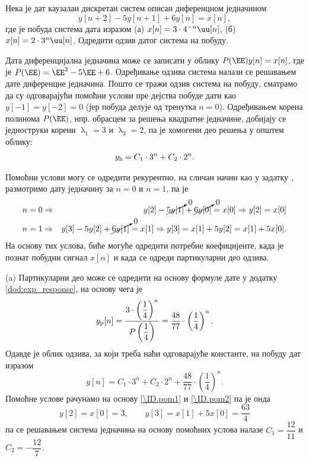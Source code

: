 \PID
Нека је дат каузалан дискретан систем описан диференцном једначином 
$$y[n+2] - 5 y[n+1] + 6 y[n] = x[n],$$ где је побуда система 
дата изразом (а) $x[n] = 3\cdot 4^{-n} \uu[n]$, (б) $x[n] = 2 \cdot 3^n \uu[n]$. Одредити одзив датог система на побуду.     

\RESENJE 
Дата диференцијална једначина може се записати у облику 
$P(\EE) y[n] = x[n]$, где је $P(\EE) = \EE^2 - 5\EE + 6$. 
Одређивање одзива система налази се решавањем дате диференцне једначина. Пошто се тражи одзив система на побуду, 
сматрамо да су одговарајући помоћни услови пре дејства побуде дати као $y[-1] = y[-2] = 0$ (јер побуда делује од 
тренутка $n=0$). Одређивањем корена полинома $P(\EE)$, нпр. обрасцем за решења квадратне једначине, добијају се 
једноструки корени $\uplambda_1 = 3$ и $\uplambda_2 = 2$, па је хомогени део решења у општем облику:
\begin{eqnarray}
    y_{\rm h} = C_1 \cdot 3^n + C_2 \cdot 2^n.
\end{eqnarray}

Помоћни услови могу се одредити рекурентно, на сличан начин као у задатку , размотримо дату једначину за $n = 0$ и $n = 1$, па је 
\begin{eqnarray}
    n=0 &\Rightarrow& y[2] - \cancelto{0}{5 y[1]} + \cancelto{0}{6 y[0]} = x[0] \Rightarrow y[2] = x[0] \label{\ID.pom1}
    \\ 
    n=1 &\Rightarrow& y[3] - 5y[2] + \cancelto{0}{6y[1]} = x[1] \Rightarrow y[3] = x[1] + 5 y[2] = x[1] + 5 x[0]. \label{\ID.pom2}
\end{eqnarray}
На основу тих услова, биће могуће одредити потребне коефицијенте, када је познат побудни сигнал $x[n]$ и када се одреди партикуларни део одзива.



(a) Партикуларни део може се одредити на основу формуле дате у додатку \ref{dod:exp_response}, на основу чега је 
\begin{eqnarray}
    y_{\rm p}[n] = \dfrac{3 \cdot \left( \dfrac14 \right)^n }{ P\left( \dfrac14 \right) } = \dfrac{48}{77} \cdot \left( \dfrac14 \right)^n.
\end{eqnarray}
Одавде је облик одзива, за који треба наћи одговарајуће константе, на побуду дат изразом 
\begin{equation}
    y[n] = C_1 \cdot 3^n + C_2 \cdot 2^n +  \dfrac{48}{77} \cdot \left( \dfrac14 \right)^n.
\end{equation}
Помоћне услове рачунамо на основу \eqref{\ID.pom1} и \eqref{\ID.pom2} па је онда 
\begin{equation}
    y[2] = x[0] = 3, \qquad y[3] = x[1] + 5x[0] = \dfrac{63}{4}   
\end{equation}
па се решавањем система једначина на основу помоћних услова налазе $C_1 = \dfrac{12}{11}$ и $C_2 = -\dfrac{12}{7}$.

